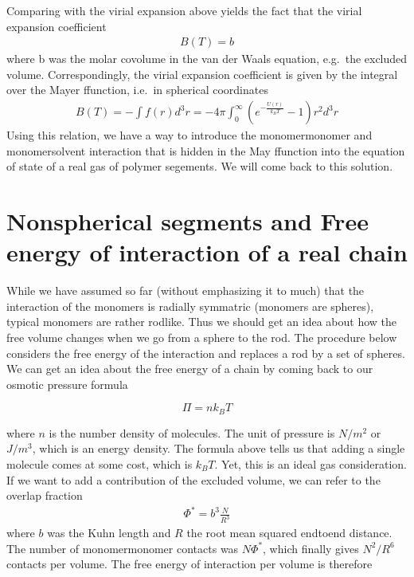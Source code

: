 \documentclass[letterpaper,10pt,english]{sphinxmanual}
\begin{document}
\sphinxAtStartPar
Comparing with the virial expansion above yields the fact that the virial expansion coefficient
\begin{equation*}
\begin{split}B(T)=b\end{split}
\end{equation*}
\sphinxAtStartPar
where b was the molar co\sphinxhyphen{}volume in the van der Waals equation, e.g. the excluded volume. Correspondingly, the virial expansion coefficient is given by the integral over the Mayer f\sphinxhyphen{}function, i.e. in spherical coordinates
\begin{equation*}
\begin{split}B(T)=-\int f(r)d^3r=-4 \pi \int_{0}^{\infty}\left(e^{-\frac{U(r)}{k_B T}}-1\right) r^{2} d^3r\end{split}
\end{equation*}
\sphinxAtStartPar
Using this relation, we have a way to introduce the monomer\sphinxhyphen{}monomer and monomer\sphinxhyphen{}solvent interaction that is hidden in the May f\sphinxhyphen{}function into the equation of state of a real gas of polymer segements. We will come back to this solution.


\section{Non\sphinxhyphen{}spherical segments and Free energy of interaction of a real chain}
\label{\detokenize{notebooks/L22/1_real_polymers:Non-spherical-segments-and-Free-energy-of-interaction-of-a-real-chain}}
\sphinxAtStartPar
While we have assumed so far (without emphasizing it to much) that the interaction of the monomers is radially symmatric (monomers are spheres), typical monomers are rather rod\sphinxhyphen{}like. Thus we should get an idea about how the free volume changes when we go from a sphere to the rod. The procedure below considers the free energy of the interaction and replaces a rod by a set of spheres. We can get an idea about the free energy of a chain by coming back to our osmotic pressure formula

\sphinxAtStartPar
\begin{equation}
\Pi=n k_B T
\end{equation}

\sphinxAtStartPar
where \(n\) is the number density of molecules. The unit of pressure is \(N/m^2\) or \(J/m^3\), which is an energy density. The formula above tells us that adding a single molecule comes at some cost, which is \(k_B T\). Yet, this is an ideal gas consideration. If we want to add a contribution of the excluded volume, we can refer to the overlap fraction
\begin{equation*}
\begin{split}\Phi^*=b^3 \frac{N}{R^3}\end{split}
\end{equation*}
\sphinxAtStartPar
where \(b\) was the Kuhn length and \(R\) the root mean squared end\sphinxhyphen{}to\sphinxhyphen{}end distance. The number of monomer\sphinxhyphen{}monomer contacts was \(N\Phi^*\), which finally gives \(N^2/R^6\) contacts per volume. The free energy of interaction per volume is therefore
\end{document}
